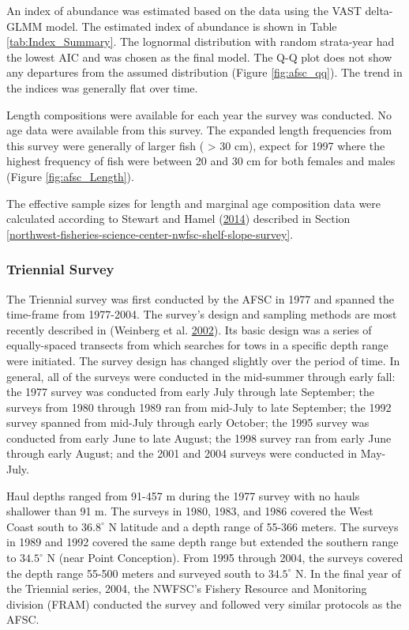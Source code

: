 \documentclass[12pt,]{article}
\begin{document}
An index of abundance was estimated based on the data using the VAST
delta-GLMM model. The estimated index of abundance is shown in Table
\ref{tab:Index_Summary}. The lognormal distribution with random
strata-year had the lowest AIC and was chosen as the final model. The
Q-Q plot does not show any departures from the assumed distribution
(Figure \ref{fig:afsc_qq}). The trend in the indices was generally flat
over time.

Length compositions were available for each year the survey was
conducted. No age data were available from this survey. The expanded
length frequencies from this survey were generally of larger fish (
\textgreater{} 30 cm), expect for 1997 where the highest frequency of
fish were between 20 and 30 cm for both females and males (Figure
\ref{fig:afsc_Length}).

The effective sample sizes for length and marginal age composition data
were calculated according to Stewart and Hamel
(\protect\hyperlink{ref-stewart_bootstrapping_2014}{2014}) described in
Section
\ref{northwest-fisheries-science-center-nwfsc-shelf-slope-survey}.

\subsubsection{Triennial Survey}\label{triennial-survey}

The Triennial survey was first conducted by the AFSC in 1977 and spanned
the time-frame from 1977-2004. The survey's design and sampling methods
are most recently described in (Weinberg et al.
\protect\hyperlink{ref-weinberg_estimation_2002}{2002}). Its basic
design was a series of equally-spaced transects from which searches for
tows in a specific depth range were initiated. The survey design has
changed slightly over the period of time. In general, all of the surveys
were conducted in the mid-summer through early fall: the 1977 survey was
conducted from early July through late September; the surveys from 1980
through 1989 ran from mid-July to late September; the 1992 survey
spanned from mid-July through early October; the 1995 survey was
conducted from early June to late August; the 1998 survey ran from early
June through early August; and the 2001 and 2004 surveys were conducted
in May-July.

Haul depths ranged from 91-457 m during the 1977 survey with no hauls
shallower than 91 m. The surveys in 1980, 1983, and 1986 covered the
West Coast south to \(36.8^\circ\) N latitude and a depth range of
55-366 meters. The surveys in 1989 and 1992 covered the same depth range
but extended the southern range to \(34.5^\circ\) N (near Point
Conception). From 1995 through 2004, the surveys covered the depth range
55-500 meters and surveyed south to \(34.5^\circ\) N. In the final year
of the Triennial series, 2004, the NWFSC's Fishery Resource and
Monitoring division (FRAM) conducted the survey and followed very
similar protocols as the AFSC.
\end{document}
